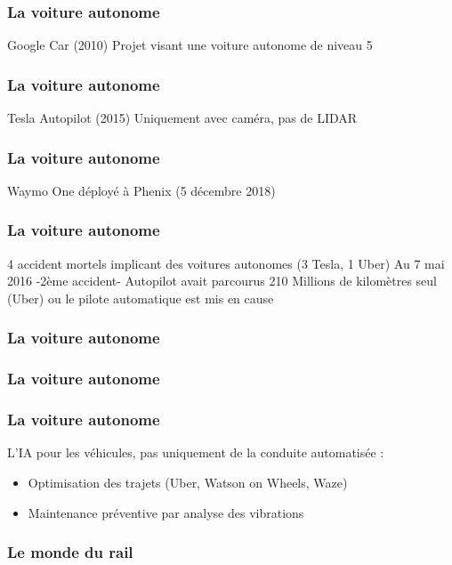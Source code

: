 \begin{frame}
  \frametitle{La voiture autonome}
  Google Car (2010)
  \newline
  Projet visant une voiture autonome de niveau 5
\end{frame}

\begin{frame}
  \frametitle{La voiture autonome}
  Tesla Autopilot (2015)
  \newline
  Uniquement avec caméra, pas de LIDAR
  \newline
\end{frame}

\begin{frame}
  \frametitle{La voiture autonome}
  Waymo One déployé à Phenix (5 décembre 2018)
\end{frame}

\begin{frame}
  \frametitle{La voiture autonome}
  4 accident mortels implicant des voitures autonomes (3 Tesla, 1 Uber)
  \newline
  Au 7 mai 2016 -2ème accident- Autopilot avait parcourus 210 Millions de kilomètres
   seul (Uber) ou le pilote automatique est mis en cause
\end{frame}

\begin{frame}
  \frametitle{La voiture autonome}
\end{frame}

\begin{frame}
  \frametitle{La voiture autonome}
\end{frame}

\begin{frame}
  \frametitle{La voiture autonome}
  L'IA pour les véhicules, pas uniquement de la conduite automatisée :
  \begin{itemize}
  \item Optimisation des trajets (Uber, Watson on Wheels, Waze)
  \item Maintenance préventive par analyse des vibrations
  \end{itemize}
\end{frame}

\begin{frame}
  \frametitle{Le monde du rail}
\end{frame}

